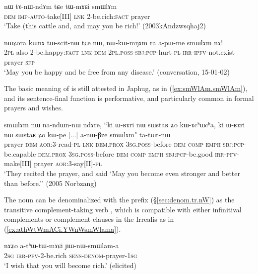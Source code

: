 \begin{exe}
	\ex \label{ex:tWmACi.smWlAm}
	\gll  nɯ tɤ-nɯ-ndɤm tɕe tɯ-mɤɕi smɯlɤm  \\
	\textsc{dem} \textsc{imp}-\textsc{auto}-take[III] \textsc{lnk} 2-be.rich:\textsc{fact} prayer \\
	\glt `Take (this cattle and, and may you be rich!' (2003kAndzwsqhaj2)
\end{exe}

\begin{exe}
	\ex \label{ex:tWscitnW.nWkWmNAm.smWlAm}
	\gll    nɯʑora kɯnɤ tɯ-scit-nɯ tɕe nɯ, nɯ-kɯ-mŋɤm ra a-pɯ-me smɯlɤm nɤ! \\
	\textsc{2pl} also 2-be.happy:\textsc{fact} \textsc{lnk} \textsc{dem} \textsc{2pl}.\textsc{poss}-\textsc{sbj}:\textsc{pcp}-hurt \textsc{pl} \textsc{irr}-\textsc{ipfv}-not.exist prayer \textsc{sfp} \\
	\glt `May you be happy and be free from any disease.' (conversation, 15-01-02)
\end{exe}

The basic meaning of   is still attested in Japhug, as in (\ref{ex:smWlAm.smWlAm}), and its sentence-final function is performative, and particularly common in formal prayers and wishes.

\begin{exe}
	\ex \label{ex:smWlAm.smWlAm}
	\gll    smɯlɤm nɯ na-ndɯn-nɯ ndɤre, ``ki ɯ-ʁɤri nɯ sɯstaʁ ʑo kɯ-ɤcʰɯcʰa, ki ɯ-ʁɤri nɯ sɯstaʁ ʑo kɯ-pe [...] a-nɯ-βze smɯlɤm" ta-tɯt-nɯ \\
	prayer \textsc{dem} \textsc{aor}:3\flobv{}-read-\textsc{pl}  \textsc{lnk} \textsc{dem}.\textsc{prox} \textsc{3sg}.\textsc{poss}-before \textsc{dem} \textsc{comp} \textsc{emph} \textsc{sbj}:\textsc{pcp}-be.capable \textsc{dem}.\textsc{prox} \textsc{3sg}.\textsc{poss}-before  \textsc{dem} \textsc{comp}  \textsc{emph} \textsc{sbj}:\textsc{pcp}-be.good  {   } \textsc{irr}-\textsc{pfv}-make[III] prayer  \textsc{aor}:3\flobv{}-say[II]-\textsc{pl} \\
	\glt `They recited the prayer, and said `May you become even stronger and better than before.'' (2005 Norbzang)
\end{exe}  

The noun  can be denominalized with the prefix  (§\ref {sec:denom.tr.nW}) as the transitive complement-taking verb , which is compatible with either infinitival complements or complement clauses in the Irrealis as in (\ref{ex:athWtWmACi.YWnWsmWlama}).

\begin{exe}
	\ex \label{ex:athWtWmACi.YWnWsmWlama}
	\gll  nɤʑo a-tʰɯ-tɯ-mɤɕi  ɲɯ-nɯ-smɯlam-a \\
	\textsc{2sg} \textsc{irr}-\textsc{pfv}-2-be.rich \textsc{sens}-\textsc{denom}-prayer-\textsc{1sg} \\
	\glt `I wish that you will become rich.' (elicited)
\end{exe}  

